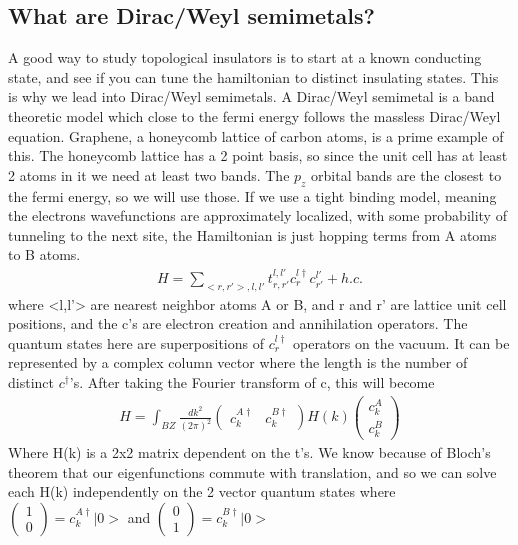 \subsection{What are Dirac/Weyl semimetals?}

A good way to study topological insulators is to start at a known conducting state, and see if you can tune the hamiltonian to distinct insulating states. This is why we lead into Dirac/Weyl semimetals. A Dirac/Weyl semimetal is a band theoretic model which close to the fermi energy follows the massless Dirac/Weyl equation. Graphene, a honeycomb lattice of carbon atoms, is a prime example of this. The honeycomb lattice has a 2 point basis, so since the unit cell has at least 2 atoms in it we need at least two bands. The $p_z$ orbital bands are the closest to the fermi energy, so we will use those. If we use a tight binding model, meaning the electrons wavefunctions are approximately localized, with some probability of tunneling to the next site, the Hamiltonian is just hopping terms from A atoms to B atoms.
\begin{align}
H=\sum_{<r,r'>,l,l'}t^{l,l'}_{r,r'}c^{l\dag}_rc^{l'}_{r'} +h.c.
\end{align}
where <l,l'> are nearest neighbor atoms A or B, and r and r' are lattice unit cell positions, and the c's are electron creation and annihilation operators. The quantum states here are superpositions of $c^{l\dag}_r$ operators on the vacuum. It can be represented by a complex column vector where the length is the number of distinct $c^\dag$'s. After taking the Fourier transform of c, this will become 
\begin{align}
H=\int_{BZ}\frac{dk^2}{(2\pi)^2} 
\begin{pmatrix}
c^{A\dag}_k & c^{B\dag}_k
\end{pmatrix}
H(k)
\begin{pmatrix}
c^{A}_k \\
c^{B}_k
\end{pmatrix} 
\end{align}
Where H(k) is a 2x2 matrix dependent on the t's. We know because of Bloch's theorem that our eigenfunctions commute with translation, and so we can solve each H(k) independently on the 2 vector quantum states where $\begin{pmatrix}
	1 \\
	0
\end{pmatrix} = c^{A\dag}_k|0>$ and  $\begin{pmatrix}
0 \\
1
\end{pmatrix} = c^{B\dag}_k|0>$
